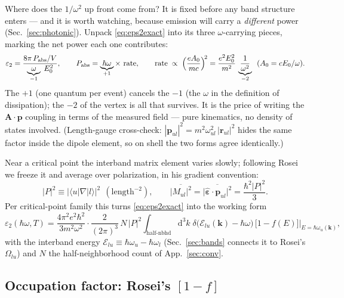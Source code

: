 \documentclass[11pt,a4paper]{article}
\numberwithin{equation}{section}
\begin{document}
Where does the $1/\omega^2$ up front come from?  It is fixed before
any band structure enters --- and it is worth watching, because
emission will carry a \emph{different} power
(Sec.~\ref{sec:photonic}).  Unpack \eqref{eq:eps2exact} into its three
$\omega$-carrying pieces, marking the net power each one contributes:
\begin{equation}
{\varepsilon}_2=\frac{8\pi\,P_{\rm abs}/V}
{\underbrace{\textstyle\omega}_{-1}\;E_0^{2}},
\qquad
P_{\rm abs}=\underbrace{\textstyle{\hbar\omega}}_{+1}\times\ \text{rate},
\qquad
\text{rate}\;\propto\;
\Bigl(\frac{eA_0}{mc}\Bigr)^{\!2}
=\frac{e^{2}E_0^{2}}{m^{2}}\,
\underbrace{\frac{1}{\omega^{2}}}_{-2}\ \ (A_0=cE_0/\omega).
\label{eq:wcount}
\end{equation}
The $+1$ (one quantum per event) cancels the $-1$ (the $\omega$ in the
definition of dissipation); the $-2$ of the vertex is all that
survives.  It is the price of writing the
$\mathbf A\!\cdot\!\mathbf p$ coupling in terms of the measured field
--- pure kinematics, no density of states involved.  (Length-gauge
cross-check: $|{\mathbf{p}_{ul}}|^2=m^2\omega_{ul}^2\,|\mathbf r_{ul}|^2$ hides the
same factor inside the dipole element, so on shell the two forms agree
identically.)

Near a critical point the interband matrix element varies slowly;
following Rosei we freeze it and average over polarization, in his
gradient convention:
\begin{equation}
|P|^2\equiv\bigl|\langle u|\nabla|l\rangle\bigr|^2
\ \ (\text{length}^{-2}),
\qquad
\overline{|M_{ul}|^2}
=\overline{\bigl|\hat{\bm{\varepsilon}}\!\cdot\!{\mathbf{p}_{ul}}\bigr|^2}
=\frac{\hbar^2|P|^2}{3} .
\label{eq:Pdef}
\end{equation}
Per critical-point family this turns \eqref{eq:eps2exact} into the
working form
\begin{equation}
{\varepsilon}_2({\hbar\omega},T)=\frac{4\pi^2e^2\hbar^2}{3m^2\omega^2}\cdot
\frac{2}{(2\pi)^3}\,N\,|P|^2
\int_{\text{half-nbhd}}\!\!{\mathrm{d}}^3k\;
\delta\bigl({\mathcal{E}_{lu}}(\mathbf k)-{\hbar\omega}\bigr)\,
\bigl[1-{f}(E)\bigr]\Bigr|_{E=\hbar\omega_u(\mathbf k)},
\label{eq:star}
\end{equation}
with the interband energy ${\mathcal{E}_{lu}}\equiv\hbar\omega_u-\hbar\omega_l$
(Sec.~\ref{sec:bands} connects it to Rosei's $\Omega_{lu}$) and $N$
the half-neighborhood count of App.~\ref{sec:conv}.

\subsection{Occupation factor: Rosei's $[1-f]$}\label{sec:occupation}
\end{document}
